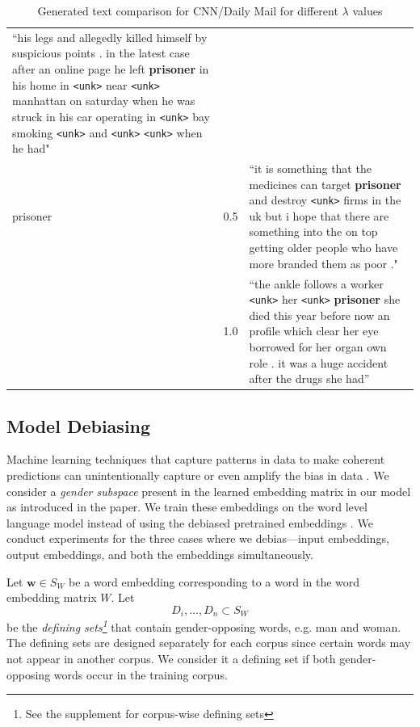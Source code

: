 \documentclass[11pt,a4paper]{article}
\begin{document}
\begin{table}[t]
\begin{tabularx}{\linewidth}{lrX}
``his legs and allegedly killed himself by suspicious points . in
the latest case after an online page he left \textbf{prisoner} in his home in \verb+<unk>+ near \verb+<unk>+ manhattan on
saturday when he was struck in his car operating in \verb+<unk>+ bay smoking \verb+<unk>+ and \verb+<unk>+ \verb+<unk>+ when he had"\\
      prisoner & 0.5 & ``it is something that the medicines can target \textbf{prisoner} and destroy \verb+<unk>+ firms in the
uk but i hope that there are something into the on top getting older people who have more branded them
as poor ."\\
      & 1.0 & ``the ankle follows a worker \verb+<unk>+
her \verb+<unk>+ \textbf{prisoner} she died this year before now an profile which clear her eye borrowed for her organ own
role . it was a huge accident after the drugs she had'' \\
    \bottomrule
    \end{tabularx}
    \caption{Generated text comparison for CNN/Daily Mail for different $\lambda$  values}
    \label{tab:4}
\end{table}



\subsection{Model Debiasing}
Machine learning techniques that capture patterns in data to make coherent predictions can unintentionally capture or even amplify the bias in data \citep{Zhao2017men}. We consider a {\it gender subspace} present in the learned embedding matrix in our model as introduced in the \citet{bolukbasi2016man} paper. We train these embeddings on the word level language model instead of using the debiased pretrained embeddings \citep{Joel2019}. We conduct experiments for the three cases where we debias---input embeddings, output embeddings, and both the embeddings simultaneously.


Let $\mathbf{w} \in S_W$ be a word embedding corresponding to a word in the word embedding matrix $W$. Let $$D_i,\ldots, D_n \subset S_W$$ be the {\it defining sets\footnote{See the supplement for corpus-wise defining sets 
    }} that contain gender-opposing words, e.g. man and woman.
    The defining sets are designed separately for each corpus since certain words may not appear in another corpus. We consider it a defining set if both gender-opposing words occur in the training corpus. 
    
\end{document}
